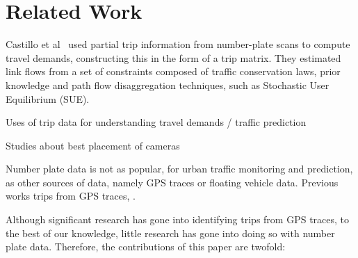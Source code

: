 \section{Related Work}
\label{s.related}


Castillo et al~\cite{Castillo2008} used partial trip information from number-plate scans to compute travel demands, constructing this in the form of a trip matrix. They estimated link flows from a set of constraints composed of traffic conservation laws, prior knowledge and path flow disaggregation techniques, such as Stochastic User Equilibrium (SUE).


{\color{red}Uses of trip data for understanding travel demands / traffic prediction

Studies about best placement of cameras

Number plate data is not as popular, for urban traffic monitoring and prediction, as other sources of data, namely GPS traces or floating vehicle data.
Previous works trips from GPS traces, .




Although significant research has gone into identifying trips from GPS traces, to the best of our knowledge, little research has gone into doing so with number plate data. Therefore, the contributions of this paper are twofold:

}